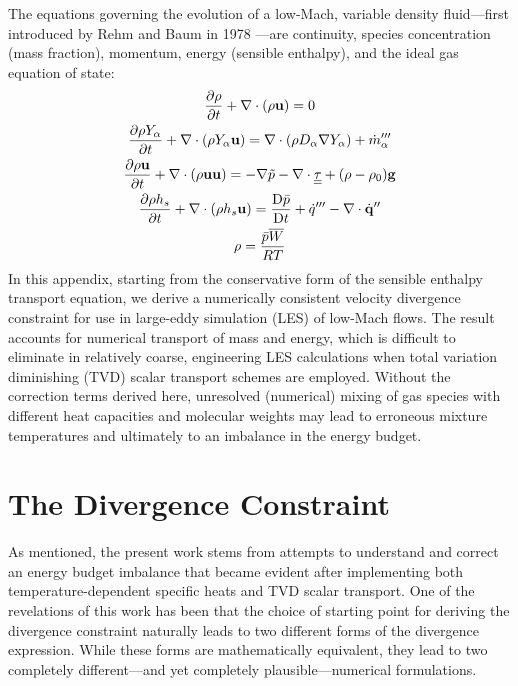 The equations governing the evolution of a low-Mach, variable density fluid---first introduced by Rehm and Baum in 1978 \cite{Rehm:1}---are continuity, species concentration (mass fraction), momentum, energy (sensible enthalpy), and the ideal gas equation of state:
\begin{gather}
\label{eqn_rho} \frac{\partial \rho}{\partial t} + \nabla\cdot(\rho\mathbf{u}) = 0 \\
\label{eqn_Y_a} \frac{\partial \rho Y_\alpha}{\partial t} + \nabla\cdot(\rho Y_\alpha \mathbf{u}) = \nabla\cdot (\rho D_\alpha \nabla Y_\alpha) + \dot{m}_\alpha^{\prime\prime\prime} \\
\label{eqn_u}   \frac{\partial \rho \mathbf{u}}{\partial t} + \nabla\cdot(\rho \mathbf{u} \mathbf{u}) = -\nabla \tilde{p} - \nabla\cdot\underline{\underline{\tau}} + (\rho-\rho_0) \mathbf{g} \\
\label{eqn_h_s} \frac{\partial \rho h_s}{\partial t} + \nabla\cdot(\rho h_s \mathbf{u}) = \frac{\mbox{D} \bar{p}}{\mbox{D} t} + \dot{q}^{\prime\prime\prime} - \nabla\cdot \dot{\mathbf{q}}^{\prime\prime} \\
\label{eqn_eos} \rho = \frac{\bar{p} \overline{W}}{RT}
\end{gather}
In this appendix, starting from the conservative form of the sensible enthalpy transport equation, we derive a numerically consistent velocity divergence constraint for use in large-eddy simulation (LES) of low-Mach flows.  The result accounts for numerical transport of mass and energy, which is difficult to eliminate in relatively coarse, engineering LES calculations when total variation diminishing (TVD) scalar transport schemes are employed.  Without the correction terms derived here, unresolved (numerical) mixing of gas species with different heat capacities and molecular weights may lead to erroneous mixture temperatures and ultimately to an imbalance in the energy budget.

\section{The Divergence Constraint}
\label{div_constraint}

As mentioned, the present work stems from attempts to understand and correct an energy budget imbalance that became evident after implementing both temperature-dependent specific heats and TVD scalar transport. One of the revelations of this work has been that the choice of starting point for deriving the divergence constraint naturally leads to two different forms of the divergence expression.  While these forms are mathematically equivalent, they lead to two completely different---and yet completely plausible---numerical formulations.

